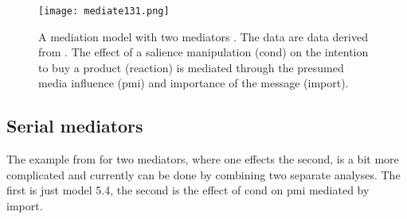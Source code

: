 \documentclass[11pt]{article}
\begin{document}
%
%
%
%
%
%
%
%
%
%
\begin{figure}[htbp]
\begin{center}
\texttt{[image: mediate131.png]}
\caption{A  mediation model with two mediators \citep[p 131] {hayes:13}.  The data are  data derived from \cite{talor:10}. The effect of a salience manipulation (cond) on the intention to buy a product (reaction) is mediated through the presumed media influence (pmi) and importance of the message (import).} 
\label{fig:2m}
\end{center}
\end{figure}

\subsection{Serial mediators}  

The example from \cite{hayes:13} for two mediators, where one effects the second, is a bit more complicated and currently can be done by combining two separate analyses. The first is just model 5.4, the second is the effect of cond on pmi mediated by import.  
\end{document}
